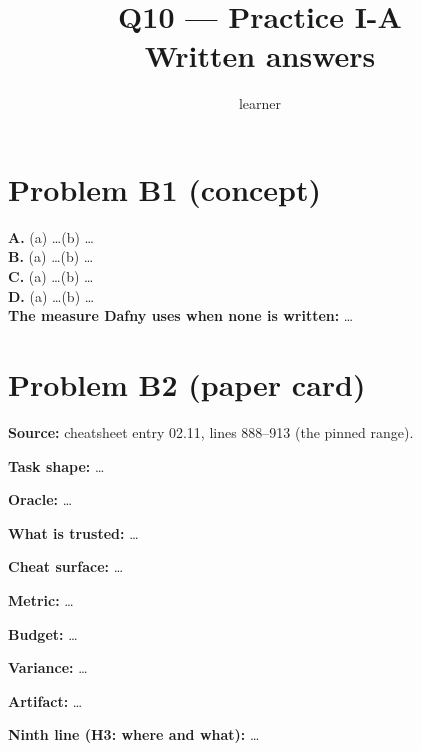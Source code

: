 \documentclass[11pt]{article}
\title{Q10 --- Practice I-A \\ \large Written answers}
\author{learner}
\date{}
\begin{document}
\maketitle

\section*{Problem B1 (concept)}\label{ans:B1}
\begin{answer}
\textbf{A.} (a) \dots \quad (b) \dots \\
\textbf{B.} (a) \dots \quad (b) \dots \\
\textbf{C.} (a) \dots \quad (b) \dots \\
\textbf{D.} (a) \dots \quad (b) \dots \\
\textbf{The measure Dafny uses when none is written:} \dots
\end{answer}

\section*{Problem B2 (paper card)}\label{ans:B2}
\begin{answer}
\textbf{Source:} cheatsheet entry 02.11, lines 888--913 (the pinned range).

\textbf{Task shape:} \dots

\textbf{Oracle:} \dots

\textbf{What is trusted:} \dots

\textbf{Cheat surface:} \dots

\textbf{Metric:} \dots

\textbf{Budget:} \dots

\textbf{Variance:} \dots

\textbf{Artifact:} \dots

\textbf{Ninth line (H3: where and what):} \dots
\end{answer}
\end{document}
